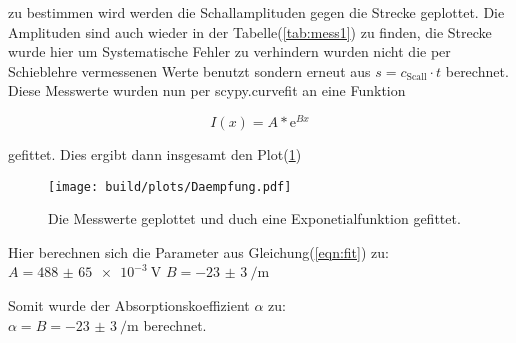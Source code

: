         \noindent zu bestimmen wird werden die Schallamplituden gegen die Strecke geplottet. Die Amplituden sind auch wieder in der 
        Tabelle(\ref{tab:mess1}) zu finden, die Strecke wurde hier um Systematische Fehler zu verhindern wurden nicht die per Schieblehre vermessenen 
        Werte benutzt sondern erneut aus $s = c_{\text{Scall}}\cdot t$ berechnet. Diese Messwerte wurden nun per scypy.curvefit an eine Funktion

        \begin{equation*}
            I(x) = A * \text{e}^{B x}
            \label{eqn:fit}
        \end{equation*}

        \noindent gefittet. Dies ergibt dann insgesamt den Plot(\ref{img:py_daem})

        \begin{figure}[h]
            \texttt{[image: build/plots/Daempfung.pdf]}
            \caption{Die Messwerte geplottet und duch eine Exponetialfunktion gefittet.}
            \label{img:py_daem}
        \end{figure}

        \noindent Hier berechnen sich die Parameter aus Gleichung(\ref{eqn:fit}) zu: \newline
        $A = \SI{488(65)e-3}{\volt}$ \newline
        $B = \SI{-23(3)}{\per\metre}$
        
        \noindent Somit wurde der Absorptionskoeffizient $\alpha$ zu:\\
        $\alpha = B = \SI{-23(3)}{\per\metre} $
        berechnet.

